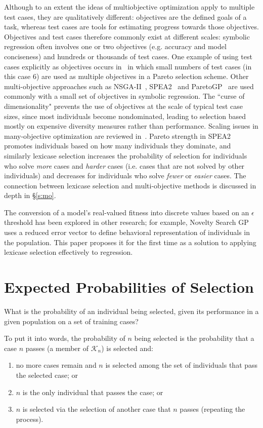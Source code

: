 \documentclass[twoside]{article}
\begin{document}
Although to an extent the ideas of multiobjective optimization apply to multiple test cases, they are qualitatively different: objectives are the defined goals of a task, whereas test cases are tools for estimating progress towards those objectives. Objectives and test cases therefore commonly exist at different scales: symbolic regression often involves one or two objectives (e.g. accuracy and model conciseness) and hundreds or thousands of test cases. One example of using test cases explicitly as objectives occurs in~\cite{langdon_evolving_1995} in which small numbers of test cases (in this case 6) are used as multiple objectives in a Pareto selection scheme. Other multi-objective approaches such as NSGA-II~\citep{schoenauer_fast_2000}, SPEA2~\citep{zitzler_spea2:_2001} and ParetoGP~\citep{smits_pareto-front_2005} are used commonly with a small set of objectives in symbolic regression. The ``curse of dimensionality" prevents the use of objectives at the scale of typical test case sizes, since most individuals become nondominated, leading to selection based mostly on expensive diversity measures rather than performance. Scaling issues in many-objective optimization are reviewed in~\citep{ishibuchi_evolutionary_2008}. Pareto strength in SPEA2 promotes individuals based on how many individuals they dominate, and similarly lexicase selection increases the probability of selection for individuals who solve {\it more} cases and {\it harder} cases (i.e. cases that are not solved by other individuals) and decreases for individuals who solve {\it fewer} or {\it easier} cases. The connection between lexicase selection and multi-objective methods is discussed in depth in \S\ref{s:mo}.
 
The conversion of a model's real-valued fitness into discrete values based on an $\epsilon$ threshold has been explored in other research; for example, Novelty Search GP~\citep{martinez_searching_2013} uses a reduced error vector to define behavioral representation of individuals in the population. This paper proposes it for the first time as a solution to applying lexicase selection effectively to regression.


\section{Expected Probabilities of Selection}\label{s:prob}
What is the probability of an individual being selected, given its performance in a given population on a set of training cases?  


To put it into words, the probability of $n$ being selected is the probability that a case $n$ passes (a member of $\mathcal{K}_n$) is selected and: \begin{enumerate} \item no more cases remain and $n$ is selected among the set of individuals that pass the selected case; or \item $n$ is the only individual that passes the case; or \item $n$ is selected via the selection of another case that $n$ passes (repeating the process). \end{enumerate} 
\end{document}
